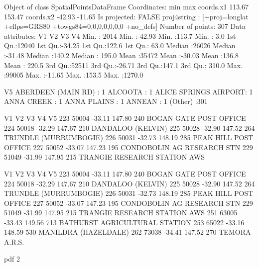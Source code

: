 \documentclass[a4paper]{article}                %
\begin{document}
\begin{Schunk}
\begin{Soutput}
Object of class SpatialPointsDataFrame
Coordinates:
             min    max
coords.x1 113.67 153.47
coords.x2 -42.93 -11.65
Is projected: FALSE 
proj4string :
[+proj=longlat +ellps=GRS80 +towgs84=0,0,0,0,0,0,0 +no_defs]
Number of points: 307
Data attributes:
       V1              V2               V3              V4        
 Min.   : 2014   Min.   :-42.93   Min.   :113.7   Min.   :   3.0  
 1st Qu.:12040   1st Qu.:-34.25   1st Qu.:122.6   1st Qu.:  63.0  
 Median :26026   Median :-31.48   Median :140.2   Median : 195.0  
 Mean   :35472   Mean   :-30.03   Mean   :136.8   Mean   : 220.5  
 3rd Qu.:52511   3rd Qu.:-26.71   3rd Qu.:147.1   3rd Qu.: 310.0  
 Max.   :99005   Max.   :-11.65   Max.   :153.5   Max.   :1270.0  
                                                                  
                     V5     
 ABERDEEN (MAIN RD)   :  1  
 ALCOOTA              :  1  
 ALICE SPRINGS AIRPORT:  1  
 ANNA CREEK           :  1  
 ANNA PLAINS          :  1  
 ANNEAN               :  1  
 (Other)              :301  
\end{Soutput}
\begin{Soutput}
       V1     V2     V3  V4                           V5
223 50004 -33.11 147.80 240       BOGAN GATE POST OFFICE
224 50018 -32.29 147.67 210            DANDALOO (KELVIN)
225 50028 -32.90 147.52 264       TRUNDLE  (MURRUMBOGIE)
226 50031 -32.73 148.19 285        PEAK HILL POST OFFICE
227 50052 -33.07 147.23 195   CONDOBOLIN AG RESEARCH STN
229 51049 -31.99 147.95 215 TRANGIE RESEARCH STATION AWS
\end{Soutput}
\begin{Soutput}
       V1     V2     V3  V4                            V5
223 50004 -33.11 147.80 240        BOGAN GATE POST OFFICE
224 50018 -32.29 147.67 210             DANDALOO (KELVIN)
225 50028 -32.90 147.52 264        TRUNDLE  (MURRUMBOGIE)
226 50031 -32.73 148.19 285         PEAK HILL POST OFFICE
227 50052 -33.07 147.23 195    CONDOBOLIN AG RESEARCH STN
229 51049 -31.99 147.95 215  TRANGIE RESEARCH STATION AWS
251 63005 -33.43 149.56 713 BATHURST AGRICULTURAL STATION
253 65022 -33.16 148.59 530          MANILDRA (HAZELDALE)
262 73038 -34.41 147.52 270                 TEMORA A.R.S.
\end{Soutput}
\begin{Soutput}
pdf 
  2 
\end{Soutput}
\end{Schunk}
\end{document}
